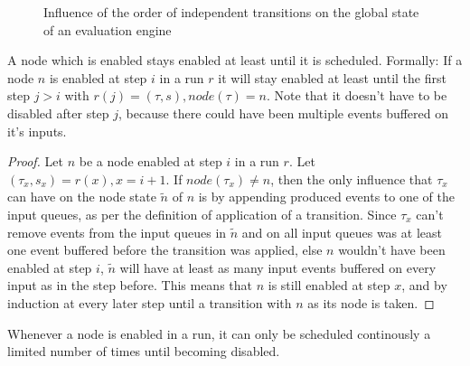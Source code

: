 \begin{figure}
  \caption{Influence of the order of independent transitions on the global state of an evaluation engine}
\label{fig:chap4:sec_run:exchange_transitions}
\end{figure}

\begin{lemma}[name = Duration of Enabledness]\label{lemma:enabled_till_scheduled}
  A node which is enabled stays enabled at least until it is scheduled.
  Formally: If a node \(n\) is enabled at step \(i\) in a run \(r\) it will stay enabled at least until the first step \(j > i\) with \(r(j) = (\tau,s), \mathit{node}(\tau) = n\).
  Note that it doesn't have to be disabled after step \(j\), because there could have been multiple events buffered on it's inputs.
\end{lemma}

\begin{proof}
  Let \(n\) be a node enabled at step \(i\) in a run \(r\).
  Let \((\tau_x,s_x) = r(x), x = i + 1\).
  If \(\mathit{node}(\tau_x) \neq n\), then the only influence that \(\tau_x\) can have on the node state \(\widetilde{n}\) of \(n\) is by appending produced events to one of the input queues, as per the definition of application of a transition.
  Since \(\tau_x\) can't remove events from the input queues in \(\widetilde{n}\) and on all input queues was at least one event buffered before the transition was applied, else \(n\) wouldn't have been enabled at step \(i\), \(\widetilde{n}\) will have at least as many input events buffered on every input as in the step before.
  This means that \(n\) is still enabled at step \(x\), and by induction at every later step until a transition with \(n\) as its node is taken.
\end{proof}

\begin{lemma}[name = Finiteness of Enabledness]\label{lemma:finiteness_enabledness}
  Whenever a node is enabled in a run, it can only be scheduled continously a limited number of times until becoming disabled.
\end{lemma}

